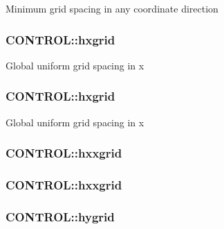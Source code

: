 Minimum grid spacing in any coordinate direction \hypertarget{struct_c_o_n_t_r_o_l_af26e7ed20a9d79368a174be7fe1d1aaf}{
\subsubsection[{hxgrid}]{ C\-O\-N\-T\-R\-O\-L\-::hxgrid}}\label{struct_c_o_n_t_r_o_l_af26e7ed20a9d79368a174be7fe1d1aaf}
Global uniform grid spacing in x \hypertarget{struct_c_o_n_t_r_o_l_a07280a355be60ddccbc5453790f34e57}{
\subsubsection[{hxgrid}]{ C\-O\-N\-T\-R\-O\-L\-::hxgrid}}\label{struct_c_o_n_t_r_o_l_a07280a355be60ddccbc5453790f34e57}
Global uniform grid spacing in x \hypertarget{struct_c_o_n_t_r_o_l_aa5b62df45765ffdad0015ff0b9bc32ac}{
\subsubsection[{hxxgrid}]{ C\-O\-N\-T\-R\-O\-L\-::hxxgrid}}\label{struct_c_o_n_t_r_o_l_aa5b62df45765ffdad0015ff0b9bc32ac}
\hypertarget{struct_c_o_n_t_r_o_l_af7bbf0919834fce4cca788aaeac010e0}{
\subsubsection[{hxxgrid}]{ C\-O\-N\-T\-R\-O\-L\-::hxxgrid}}\label{struct_c_o_n_t_r_o_l_af7bbf0919834fce4cca788aaeac010e0}
\hypertarget{struct_c_o_n_t_r_o_l_ae5901651ca55ef121154b2b76fdc49c3}{
\subsubsection[{hygrid}]{ C\-O\-N\-T\-R\-O\-L\-::hygrid}}\label{struct_c_o_n_t_r_o_l_ae5901651ca55ef121154b2b76fdc49c3}
